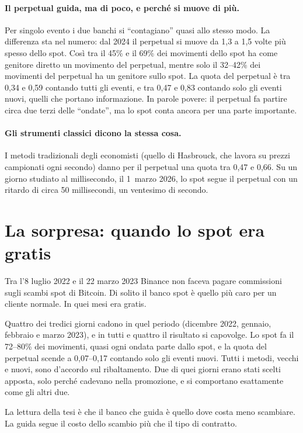 \documentclass[a4paper,11pt]{article}
\begin{document}
\paragraph{Il perpetual guida, ma di poco, e perché si muove di più.} Per singolo evento i due banchi si \enquote{contagiano} quasi allo stesso modo. La differenza sta nel numero: dal 2024 il perpetual si muove da 1,3 a 1,5 volte più spesso dello spot. Così tra il 45\% e il 69\% dei movimenti dello spot ha come genitore diretto un movimento del perpetual, mentre solo il 32--42\% dei movimenti del perpetual ha un genitore sullo spot. La quota del perpetual è tra 0,34 e 0,59 contando tutti gli eventi, e tra 0,47 e 0,83 contando solo gli eventi nuovi, quelli che portano informazione. In parole povere: il perpetual fa partire circa due terzi delle \enquote{ondate}, ma lo spot conta ancora per una parte importante.

\paragraph{Gli strumenti classici dicono la stessa cosa.} I metodi tradizionali degli economisti (quello di Hasbrouck, che lavora su prezzi campionati ogni secondo) danno per il perpetual una quota tra 0,47 e 0,66. Su un giorno studiato al millisecondo, il 1~marzo 2026, lo spot segue il perpetual con un ritardo di circa 50 millisecondi, un ventesimo di secondo.

\section*{La sorpresa: quando lo spot era gratis}

Tra l'8 luglio 2022 e il 22 marzo 2023 Binance non faceva pagare commissioni sugli scambi spot di Bitcoin. Di solito il banco spot è quello più caro per un cliente normale. In quei mesi era gratis.

Quattro dei tredici giorni cadono in quel periodo (dicembre 2022, gennaio, febbraio e marzo 2023), e in tutti e quattro il risultato si capovolge. Lo spot fa il 72--80\% dei movimenti, quasi ogni ondata parte dallo spot, e la quota del perpetual scende a 0,07--0,17 contando solo gli eventi nuovi. Tutti i metodi, vecchi e nuovi, sono d'accordo sul ribaltamento. Due di quei giorni erano stati scelti apposta, solo perché cadevano nella promozione, e si comportano esattamente come gli altri due.

La lettura della tesi è che il banco che guida è quello dove costa meno scambiare. La guida segue il costo dello scambio più che il tipo di contratto.
\end{document}
